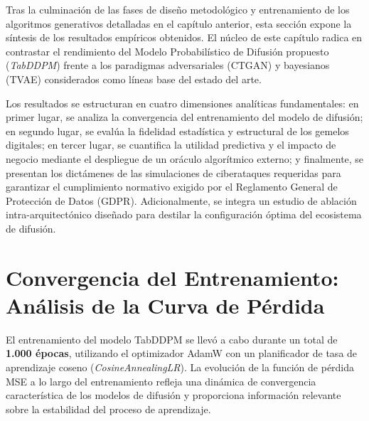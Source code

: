 
Tras la culminación de las fases de diseño metodológico y entrenamiento de los algoritmos generativos detalladas en el capítulo anterior, esta sección expone la síntesis de los resultados empíricos obtenidos. El núcleo de este capítulo radica en contrastar el rendimiento del Modelo Probabilístico de Difusión propuesto (\textit{TabDDPM}) frente a los paradigmas adversariales (CTGAN) y bayesianos (TVAE) considerados como líneas base del estado del arte.

Los resultados se estructuran en cuatro dimensiones analíticas fundamentales: en primer lugar, se analiza la convergencia del entrenamiento del modelo de difusión; en segundo lugar, se evalúa la fidelidad estadística y estructural de los gemelos digitales; en tercer lugar, se cuantifica la utilidad predictiva y el impacto de negocio mediante el despliegue de un oráculo algorítmico externo; y finalmente, se presentan los dictámenes de las simulaciones de ciberataques requeridas para garantizar el cumplimiento normativo exigido por el Reglamento General de Protección de Datos (GDPR). Adicionalmente, se integra un estudio de ablación intra-arquitectónico diseñado para destilar la configuración óptima del ecosistema de difusión.

\setcounter{section}{0}

\section{Convergencia del Entrenamiento: Análisis de la Curva de Pérdida}

El entrenamiento del modelo TabDDPM se llevó a cabo durante un total de \textbf{1.000 épocas}, utilizando el optimizador AdamW con un planificador de tasa de aprendizaje coseno (\textit{CosineAnnealingLR}). La evolución de la función de pérdida MSE a lo largo del entrenamiento refleja una dinámica de convergencia característica de los modelos de difusión y proporciona información relevante sobre la estabilidad del proceso de aprendizaje.

